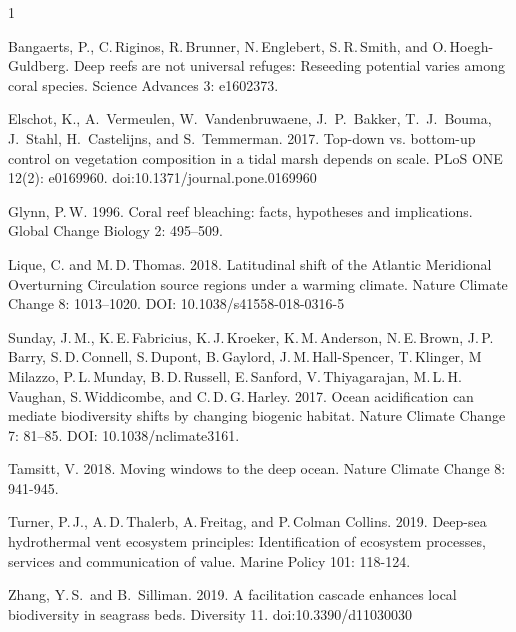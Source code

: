 \documentclass[12pt, addpoints]{exam}
\begin{document}
\begin{hangparas}{\leftmargin}{1}




Bangaerts, P., C.\,Riginos, R.\,Brunner, N.\,Englebert, 
S.\,R.\,Smith, and O.\,Hoegh-Guldberg. Deep reefs are not 
universal refuges: Reseeding potential varies among coral species.
Science Advances 3: e1602373.

Elschot, K., A.\ Vermeulen, W.\ Vandenbruwaene, J.\ P.\ Bakker, T.\ J.\ Bouma, J.\ Stahl, H.\ Castelijns, and S.\ Temmerman. 2017. Top-down vs. bottom-up control on vegetation composition in a tidal marsh depends on scale. PLoS ONE 12(2): e0169960. doi:10.1371/journal.pone.0169960

Glynn, P.\,W. 1996. Coral reef bleaching: facts, hypotheses and 
implications. Global Change Biology 2: 495–509.

Lique, C. and M.\,D.\,Thomas. 2018. Latitudinal shift of the Atlantic Meridional Overturning Circulation source regions under a warming climate. Nature Climate Change 8: 1013–1020. DOI: 10.1038/s41558-018-0316-5

Sunday, J.\,M., K.\,E.\,Fabricius, K.\,J.\,Kroeker, K.\,M.\,Anderson, N.\,E.\,Brown, J.\,P.\,Barry, S.\,D.\,Connell, S.\,Dupont, B.\,Gaylord,
J.\,M.\,Hall-Spencer, T.\,Klinger, M\,Milazzo, P.\,L.\,Munday, B.\,D.\,Russell, E.\,Sanford, V.\,Thiyagarajan, M.\,L.\,H.\,Vaughan, S.\,Widdicombe, and C.\,D.\,G.\,Harley. 2017. Ocean acidification can mediate biodiversity
shifts by changing biogenic habitat. Nature Climate Change 7: 81–85. DOI: 10.1038/nclimate3161.

Tamsitt, V. 2018. Moving windows to the deep ocean. Nature Climate Change 8: 941-945. 

Turner, P.\,J., A.\,D.\,Thalerb, A.\,Freitag, and P.\,Colman Collins. 2019. Deep-sea hydrothermal vent ecosystem principles: Identification of ecosystem processes, services and communication of value. Marine Policy 101: 118-124.

Zhang, Y.\,S.\ and B.\ Silliman. 2019. A facilitation cascade enhances local biodiversity in seagrass beds. Diversity 11. doi:10.3390/d11030030


\end{hangparas}
\end{document}
